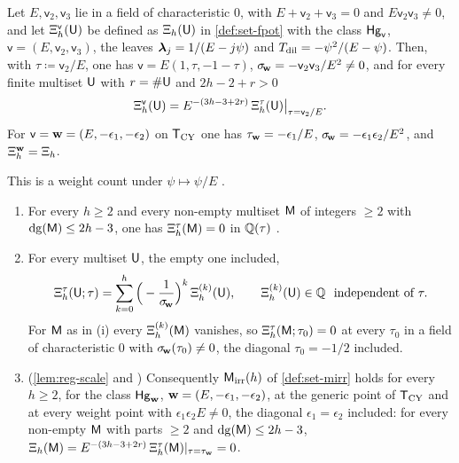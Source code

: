 \begin{lem}
\label{lem:reg-scale}
Let $E,\mathsf{v}_2,\mathsf{v}_3$ lie in a field of characteristic $0$, with $E+\mathsf{v}_2+\mathsf{v}_3=0$ and $E\mathsf{v}_2\mathsf{v}_3\neq0$, and let $\Xi^{\mathsf{v}}_h(\mathsf{U})$ be defined as $\Xi_h(\mathsf{U})$ in \cref{def:set-fpot} with the class $\mathsf{Hg}_{\mathsf{v}}$, $\mathsf{v}=(E,\mathsf{v}_2,\mathsf{v}_3)$, the leaves $\boldsymbol{\lambda}_j=1/(E-j\psi)$ and $T_{\mathrm{dil}}=-\psi^2/(E-\psi)$. Then, with $\tau\coloneqq\mathsf{v}_2/E$, one has $\mathsf{v}=E(1,\tau,-1-\tau)$, $\sigma_{\!\mathbf{w}}=-\mathsf{v}_2\mathsf{v}_3/E^2\neq0$, and for every finite multiset $\mathsf{U}$ with $r=\#\mathsf{U}$ and $2h-2+r>0$
\begin{equation}
\label{eq:reg-scale}
\Xi^{\mathsf{v}}_h(\mathsf{U})=E^{-(3h-3+2r)}\,\Xi^{\tau}_h(\mathsf{U})\big|_{\tau=\mathsf{v}_2/E}.
\end{equation}
For $\mathsf{v}=\mathbf{w}=(E,-\epsilon_1,-\epsilon_2)$ on $\mathsf{T}_{\mathrm{CY}}$ one has $\tau_{\mathbf{w}}=-\epsilon_1/E$, $\sigma_{\!\mathbf{w}}=-\epsilon_1\epsilon_2/E^2$, and $\Xi^{\mathbf{w}}_h=\Xi_h$.
\end{lem}

This is a weight count under $\psi\mapsto\psi/E$ \cite[Corollary~8.4]{LP2}.

\begin{thm}
\label{thm:reg-L}
\begin{enumerate}
\item[(i)] For every $h\geq2$ and every non-empty multiset $\mathsf{M}$ of integers $\geq2$ with $\mathrm{dg}(\mathsf{M})\leq2h-3$, one has $\Xi^{\tau}_h(\mathsf{M})=0$ in $\mathbb{Q}(\tau)$ \textup{\cite[Theorem~8.1]{LP2}}.
\item[(ii)] \textup{\cite[Corollary~8.2]{LP2}} For every multiset $\mathsf{U}$, the empty one included,
\[
\Xi^{\tau}_h(\mathsf{U};\tau)=\sum_{k=0}^{h}\Big(-\frac1{\sigma_{\!\mathbf{w}}}\Big)^k\,\Xi^{(k)}_h(\mathsf{U}),\qquad \Xi^{(k)}_h(\mathsf{U})\in\mathbb{Q}\ \text{ independent of }\tau .
\]
For $\mathsf{M}$ as in \textup{(i)} every $\Xi^{(k)}_h(\mathsf{M})$ vanishes, so $\Xi^{\tau}_h(\mathsf{M};\tau_0)=0$ at every $\tau_0$ in a field of characteristic $0$ with $\sigma_{\!\mathbf{w}}(\tau_0)\neq0$, the diagonal $\tau_0=-1/2$ included.
\item[(iv)] \textup{(\cref{lem:reg-scale} and \cite[Corollary~8.4]{LP2})} Consequently $\mathsf{M}_{\mathrm{irr}}(h)$ of \cref{def:set-mirr} holds for every $h\geq2$, for the class $\mathsf{Hg}_{\mathbf{w}}$, $\mathbf{w}=(E,-\epsilon_1,-\epsilon_2)$, at the generic point of $\mathsf{T}_{\mathrm{CY}}$ and at every weight point with $\epsilon_1\epsilon_2E\neq0$, the diagonal $\epsilon_1=\epsilon_2$ included: for every non-empty $\mathsf{M}$ with parts $\geq2$ and $\mathrm{dg}(\mathsf{M})\leq2h-3$, $\Xi_h(\mathsf{M})=E^{-(3h-3+2r)}\,\Xi^{\tau}_h(\mathsf{M})|_{\tau=\tau_{\mathbf{w}}}=0$.
\end{enumerate}
\end{thm}

